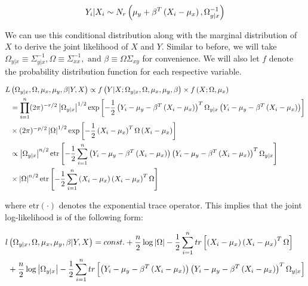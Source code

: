 \documentclass[11pt,]{report}
\begin{document}
\begin{equation}
Y_{i} | X_{i} \sim N_{r}\left( \mu_{y} + \beta^{T}\left(X_{i} - \mu_{x}\right), \Omega_{y | x}^{-1} \right)
\label{eq:linnormal}\notag
\end{equation}

We can use this conditional distribution along with the marginal distribution of \(X\) to derive the joint likelihood of \(X\) and \(Y\). Similar to before, we will take \(\Omega_{y | x} \equiv \Sigma_{y | x}^{-1}, \Omega \equiv \Sigma_{xx}^{-1}, \mbox{ and } \beta \equiv \Omega\Sigma_{xy}\) for convenience. We will also let \(f\) denote the probability distribution function for each respective variable.

\begin{equation}
\begin{split}
  L&\left( \Omega_{y | x}, \Omega, \mu_{x}, \mu_{y}, \beta | Y, X \right) \propto f\left(Y | X; \Omega_{y | x}, \Omega, \mu_{x}, \mu_{y}, \beta \right) \times f\left(X; \Omega, \mu_{x} \right) \\
  &= \prod_{i = 1}^{n} (2\pi)^{-r/2}\left| \Omega_{y | x} \right|^{1/2} \exp\left[ -\frac{1}{2}\left( Y_{i} - \mu_{y} - \beta^{T}\left(X_{i} - \mu_{x}\right) \right)^{T}\Omega_{y | x}\left( Y_{i} - \mu_{y} - \beta^{T}\left(X_{i} - \mu_{x}\right) \right) \right] \\
  &\times (2\pi)^{-p/2}\left| \Omega \right|^{1/2} \exp\left[ -\frac{1}{2}\left( X_{i} - \mu_{x} \right)^{T}\Omega\left( X_{i} - \mu_{x} \right) \right] \\
  &\propto \left| \Omega_{y | x} \right|^{n/2}\mbox{etr}\left[ -\frac{1}{2}\sum_{i = 1}^{n}\left( Y_{i} - \mu_{y} - \beta^{T}\left(X_{i} - \mu_{x}\right) \right)\left( Y_{i} - \mu_{y} - \beta^{T}\left(X_{i} - \mu_{x}\right) \right)^{T}\Omega_{y | x} \right] \\
  &\times \left| \Omega \right|^{n/2}\mbox{etr}\left[ -\frac{1}{2}\sum_{i = 1}^{n}\left( X_{i} - \mu_{x} \right)\left( X_{i} - \mu_{x} \right)^{T}\Omega \right]
\label{eq:jointlik}\notag
\end{split}
\end{equation}

where \(\mbox{etr}\left( \cdot \right)\) denotes the exponential trace operator. This implies that the joint log-likelihood is of the following form:

\begin{equation}
\begin{split}
  l&\left( \Omega_{y | x}, \Omega, \mu_{x}, \mu_{y}, \beta | Y, X \right) = const. + \frac{n}{2}\log\left| \Omega \right| - \frac{1}{2}\sum_{i = 1}^{n}tr\left[ \left( X_{i} - \mu_{x} \right)\left( X_{i} - \mu_{x} \right)^{T}\Omega \right] \\
  &+ \frac{n}{2}\log\left| \Omega_{y | x} \right| - \frac{1}{2}\sum_{i = 1}^{n} tr\left[ \left( Y_{i} - \mu_{y} - \beta^{T}\left(X_{i} - \mu_{x}\right) \right)\left( Y_{i} - \mu_{y} - \beta^{T}\left(X_{i} - \mu_{x}\right) \right)^{T}\Omega_{y | x} \right]
\label{eq:jointloglik}\notag
\end{split}
\end{equation}
\end{document}
